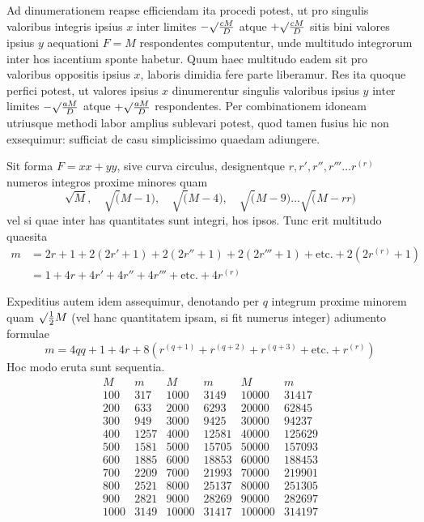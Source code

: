 Ad dinumerationem reapse efficiendam ita procedi potest, ut pro singulis valoribus integris ipsius $x$ inter limites $-\surd\frac{cM}D$ atque $+\surd\frac{cM}D$ sitis bini valores ipsius $y$ aequationi $F=M$ respondentes computentur, unde multitudo integrorum inter hos iacentium sponte habetur. Quum haec multitudo eadem sit pro valoribus oppositis ipsius $x$, laboris dimidia fere parte liberamur. Res ita quoque perfici potest, ut valores ipsius $x$ dinumerentur singulis valoribus ipsius $y$ inter limites $-\surd\frac{aM}D$ atque $+\surd\frac{aM}D$ respondentes. Per combinationem idoneam utriusque methodi labor amplius sublevari potest, quod tamen fusius hic non exsequimur: sufficiat de casu simplicissimo quaedam adiungere.

Sit forma $F=xx+yy$, sive curva circulus, designentque $r,r',r'',r'''\ldots r^{(r)}$ numeros integros proxime minores quam
\[
\surd M,\quad\surd(M-1),\quad\surd(M-4),\quad\surd(M-9)\ldots\surd(M-rr)
\]
vel si quae inter has quantitates sunt integri, hos ipsos. Tunc erit multitudo quaesita
\[
\begin{aligned}
m&=2r+1+2(2r'+1)+2(2r''+1)+2(2r'''+1)+\text{etc.}+2(2r^{(r)}+1)\\
&=1+4r+4r'+4r''+4r'''+\text{etc.}+4r^{(r)}
\end{aligned}
\]

Expeditius autem idem assequimur, denotando per $q$ integrum proxime
%
minorem quam $\surd\tfrac12 M$ (vel hanc quantitatem ipsam, si fit numerus integer) adiumento formulae
\[
m=4qq+1+4r+8(r^{(q+1)}+r^{(q+2)}+r^{(q+3)}+\text{etc.}+r^{(r)})
\]
Hoc modo eruta sunt sequentia.
\[
\begin{array}{r|r||r|r||r|r}
M&m&M&m&M&m\\\hline
100&317&1000&3149&10000&31417\\
200&633&2000&6293&20000&62845\\
300&949&3000&9425&30000&94237\\
400&1257&4000&12581&40000&125629\\
500&1581&5000&15705&50000&157093\\
600&1885&6000&18853&60000&188453\\
700&2209&7000&21993&70000&219901\\
800&2521&8000&25137&80000&251305\\
900&2821&9000&28269&90000&282697\\
1000&3149&10000&31417&100000&314197
\end{array}
\]


